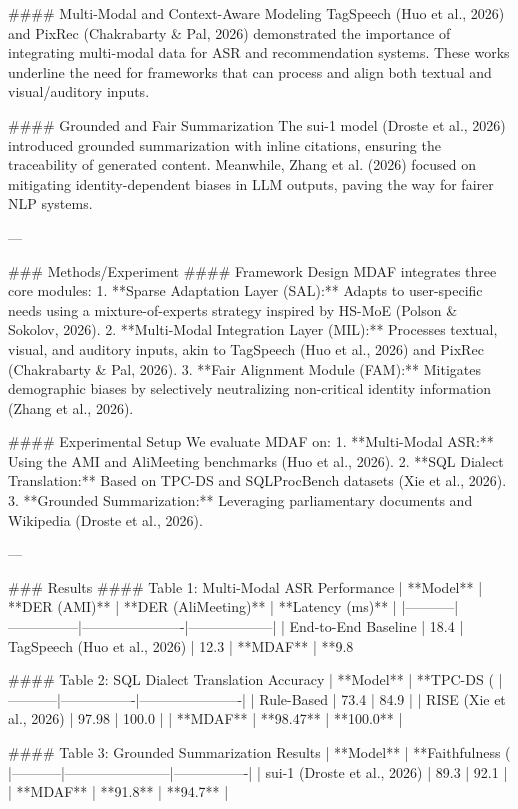 #### Multi-Modal and Context-Aware Modeling  
TagSpeech (Huo et al., 2026) and PixRec (Chakrabarty & Pal, 2026) demonstrated the importance of integrating multi-modal data for ASR and recommendation systems. These works underline the need for frameworks that can process and align both textual and visual/auditory inputs.

#### Grounded and Fair Summarization  
The sui-1 model (Droste et al., 2026) introduced grounded summarization with inline citations, ensuring the traceability of generated content. Meanwhile, Zhang et al. (2026) focused on mitigating identity-dependent biases in LLM outputs, paving the way for fairer NLP systems.

---

### Methods/Experiment  
#### Framework Design  
MDAF integrates three core modules:  
1. **Sparse Adaptation Layer (SAL):** Adapts to user-specific needs using a mixture-of-experts strategy inspired by HS-MoE (Polson & Sokolov, 2026).  
2. **Multi-Modal Integration Layer (MIL):** Processes textual, visual, and auditory inputs, akin to TagSpeech (Huo et al., 2026) and PixRec (Chakrabarty & Pal, 2026).  
3. **Fair Alignment Module (FAM):** Mitigates demographic biases by selectively neutralizing non-critical identity information (Zhang et al., 2026).

#### Experimental Setup  
We evaluate MDAF on:  
1. **Multi-Modal ASR:** Using the AMI and AliMeeting benchmarks (Huo et al., 2026).  
2. **SQL Dialect Translation:** Based on TPC-DS and SQLProcBench datasets (Xie et al., 2026).  
3. **Grounded Summarization:** Leveraging parliamentary documents and Wikipedia (Droste et al., 2026).

---

### Results  
#### Table 1: Multi-Modal ASR Performance  
| **Model** | **DER (AMI)** | **DER (AliMeeting)** | **Latency (ms)** |  
|-----------|---------------|----------------------|------------------|  
| End-to-End Baseline | 18.4%
| TagSpeech (Huo et al., 2026) | 12.3%
| **MDAF** | **9.8%

#### Table 2: SQL Dialect Translation Accuracy  
| **Model** | **TPC-DS (%
|-----------|----------------|----------------------|  
| Rule-Based | 73.4 | 84.9 |  
| RISE (Xie et al., 2026) | 97.98 | 100.0 |  
| **MDAF** | **98.47** | **100.0** |  

#### Table 3: Grounded Summarization Results  
| **Model** | **Faithfulness (%
|-----------|-----------------------|----------------|  
| sui-1 (Droste et al., 2026) | 89.3 | 92.1 |  
| **MDAF** | **91.8** | **94.7** |  


